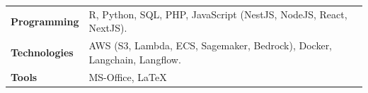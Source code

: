 \documentclass[11pt]{developercv} %
\begin{document}

\vspace{-6pt}

\begin{tabular}{p{3cm}l}
    \textbf{Programming} & R, Python, SQL, PHP, JavaScript (NestJS, NodeJS, React, NextJS).\\
    \textbf{Technologies} & AWS (S3, Lambda, ECS, Sagemaker, Bedrock), Docker, Langchain, Langflow.\\
    \textbf{Tools} & MS-Office, \LaTeX\\
\end{tabular}






\end{document}
